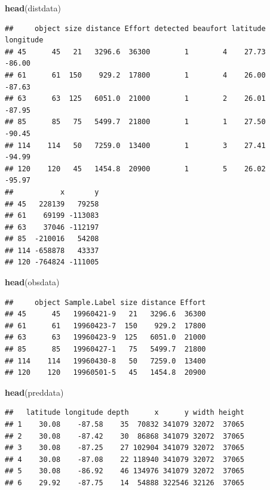 \documentclass[]{amsart}
\newenvironment{Shaded}{}{}
\newcommand{\KeywordTok}[1]{\textcolor[rgb]{0.00,0.44,0.13}{\textbf{{#1}}}}
\newcommand{\NormalTok}[1]{{#1}}
\begin{document}
\begin{Shaded}
\begin{Highlighting}[]
\KeywordTok{head}\NormalTok{(distdata)}
\end{Highlighting}
\end{Shaded}

\begin{verbatim}
##     object size distance Effort detected beaufort latitude longitude
## 45      45   21   3296.6  36300        1        4    27.73    -86.00
## 61      61  150    929.2  17800        1        4    26.00    -87.63
## 63      63  125   6051.0  21000        1        2    26.01    -87.95
## 85      85   75   5499.7  21800        1        1    27.50    -90.45
## 114    114   50   7259.0  13400        1        3    27.41    -94.99
## 120    120   45   1454.8  20900        1        5    26.02    -95.97
##           x       y
## 45   228139   79258
## 61    69199 -113083
## 63    37046 -112197
## 85  -210016   54208
## 114 -658878   43337
## 120 -764824 -111005
\end{verbatim}

\begin{Shaded}
\begin{Highlighting}[]
\KeywordTok{head}\NormalTok{(obsdata)}
\end{Highlighting}
\end{Shaded}

\begin{verbatim}
##     object Sample.Label size distance Effort
## 45      45   19960421-9   21   3296.6  36300
## 61      61   19960423-7  150    929.2  17800
## 63      63   19960423-9  125   6051.0  21000
## 85      85   19960427-1   75   5499.7  21800
## 114    114   19960430-8   50   7259.0  13400
## 120    120   19960501-5   45   1454.8  20900
\end{verbatim}

\begin{Shaded}
\begin{Highlighting}[]
\KeywordTok{head}\NormalTok{(preddata)}
\end{Highlighting}
\end{Shaded}

\begin{verbatim}
##   latitude longitude depth      x      y width height
## 1    30.08    -87.58    35  70832 341079 32072  37065
## 2    30.08    -87.42    30  86868 341079 32072  37065
## 3    30.08    -87.25    27 102904 341079 32072  37065
## 4    30.08    -87.08    22 118940 341079 32072  37065
## 5    30.08    -86.92    46 134976 341079 32072  37065
## 6    29.92    -87.75    14  54888 322546 32126  37065
\end{verbatim}
\end{document}

